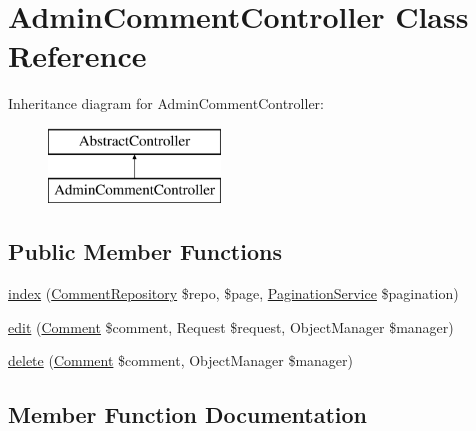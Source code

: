 \hypertarget{class_app_1_1_controller_1_1_admin_comment_controller}{}\section{Admin\+Comment\+Controller Class Reference}
\label{class_app_1_1_controller_1_1_admin_comment_controller}
Inheritance diagram for Admin\+Comment\+Controller\+:\begin{figure}[H]
\begin{center}
\leavevmode
\includegraphics[height=2.000000cm]{class_app_1_1_controller_1_1_admin_comment_controller}
\end{center}
\end{figure}
\subsection*{Public Member Functions}
\begin{DoxyCompactItemize}
\item 
\mbox{\hyperlink{class_app_1_1_controller_1_1_admin_comment_controller_a52c8d578a5ccf9d862b3a7846bd0e4c8}{index}} (\mbox{\hyperlink{class_app_1_1_repository_1_1_comment_repository}{Comment\+Repository}} \$repo, \$page, \mbox{\hyperlink{class_app_1_1_service_1_1_pagination_service}{Pagination\+Service}} \$pagination)
\item 
\mbox{\hyperlink{class_app_1_1_controller_1_1_admin_comment_controller_abd246c5607054faeb10cff8f4c723c1f}{edit}} (\mbox{\hyperlink{class_app_1_1_entity_1_1_comment}{Comment}} \$comment, Request \$request, Object\+Manager \$manager)
\item 
\mbox{\hyperlink{class_app_1_1_controller_1_1_admin_comment_controller_ab43ca0b3f3245be6ffe1606f4d4d4dee}{delete}} (\mbox{\hyperlink{class_app_1_1_entity_1_1_comment}{Comment}} \$comment, Object\+Manager \$manager)
\end{DoxyCompactItemize}


\subsection{Member Function Documentation}
\mbox{\label{class_app_1_1_controller_1_1_admin_comment_controller_ab43ca0b3f3245be6ffe1606f4d4d4dee}} 
